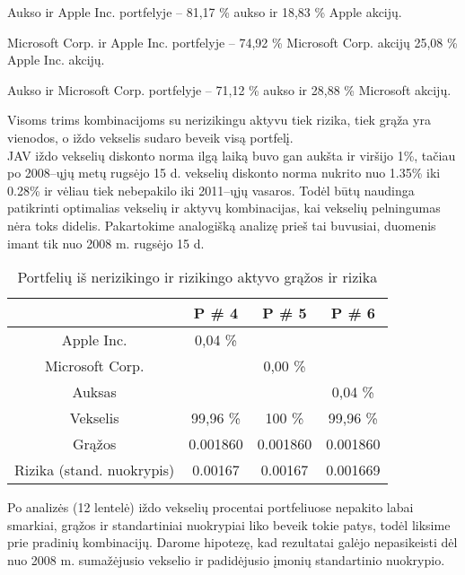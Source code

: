 \documentclass[12pt, a14paper, lithuanian]{article}
\begin{document}
Aukso ir Apple Inc. portfelyje -- 81,17 \% aukso ir 18,83 \% Apple akcijų.

Microsoft Corp. ir Apple Inc. portfelyje -- 74,92 \% Microsoft Corp. akcijų  25,08 \% Apple Inc. akcijų.

Aukso ir Microsoft Corp. portfelyje -- 71,12 \% aukso ir 28,88 \% Microsoft akcijų.

Visoms trims kombinacijoms su nerizikingu aktyvu tiek rizika, tiek grąža yra vienodos, o iždo vekselis sudaro beveik visą portfelį. \\



JAV iždo vekselių diskonto norma ilgą laiką buvo gan aukšta ir viršijo 1\%, tačiau
po 2008--ųjų metų rugsėjo 15 d. vekselių diskonto norma nukrito nuo 1.35\% iki 0.28\% ir vėliau tiek nebepakilo iki 2011--ųjų
vasaros. Todėl būtų naudinga patikrinti optimalias vekselių ir aktyvų kombinacijas, kai vekselių pelningumas
nėra toks didelis. Pakartokime analogišką analizę prieš tai buvusiai, duomenis imant tik nuo 2008 m. rugsėjo 15 d. 

\begin{table}[ht]
\begin{center}
\begin{tabular}{cccc}
  \hline
 & P \# 4 & P \# 5 & P \# 6 \\ 
  \hline
Apple Inc. & 0,04 \% &  &  &  \\
\hline
 Microsoft Corp. &  & 0,00 \% &  &  \\ 
   \hline
   Auksas & & & 0,04 \% &\\
   \hline
   Vekselis & 99,96 \% & 100 \% & 99,96 \% &\\
   \hline
   Grąžos & 0.001860 & 0.001860 & 0.001860 & \\
   \hline
   Rizika (stand. nuokrypis) & 0.00167 & 0.00167 & 0.001669 & \\
   \hline
\end{tabular}
\end{center}
\caption{Portfelių iš nerizikingo ir rizikingo aktyvo grąžos ir rizika}
\end{table}

Po analizės (12 lentelė) iždo vekselių procentai portfeliuose nepakito labai smarkiai, grąžos ir standartiniai nuokrypiai liko beveik tokie patys, todėl liksime prie pradinių kombinacijų. Darome hipotezę, kad rezultatai galėjo nepasikeisti dėl nuo 2008 m. sumažėjusio vekselio ir padidėjusio įmonių standartinio nuokrypio.


\begin{comment}

\begin{figure}[H]
  \centering
\texttt{[image: kursinis-019]}
  \caption{Dviejų aktyvų kombinacijų rizika ir grąžos}
\end{figure}  

\end{comment}
\end{document}
